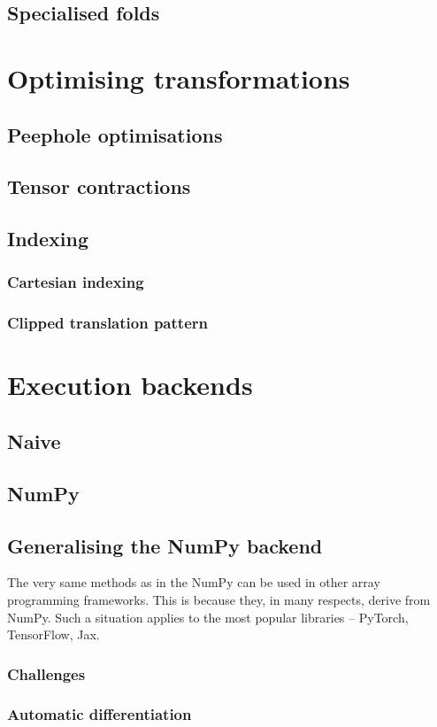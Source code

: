 \subsection{Specialised folds}

\section{Optimising transformations}

\subsection{Peephole optimisations}

\subsection{Tensor contractions}

\subsection{Indexing}

\subsubsection{Cartesian indexing}

\subsubsection{Clipped translation pattern}

\section{Execution backends}

\subsection{Naive}

\subsection{NumPy}

\subsection{Generalising the NumPy backend}

The very same methods as in the NumPy can be used in other array programming frameworks. This is because they, in many respects, derive from NumPy. Such a situation applies to the most popular libraries -- PyTorch, TensorFlow, Jax.

\subsubsection{Challenges}

\subsubsection{Automatic differentiation}